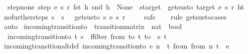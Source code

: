 \begin{isabellebody}
\ \ step{\isacharunderscore}none{\isacharcolon}\ {\isachardoublequoteopen}step\ e\ s\ r\ {\isacharparenleft}fst\ h{\isacharparenright}\ {\isacharparenleft}snd\ h{\isacharparenright}\ {\isacharequal}\ None\ {\isasymLongrightarrow}\ s{\isacharequal}target\ {\isasymLongrightarrow}\ gets{\isacharunderscore}us{\isacharunderscore}to\ target\ e\ s\ r\ {\isacharparenleft}h{\isacharhash}t{\isacharparenright}{\isachardoublequoteclose}\isanewline
\isanewline
{}\isamarkupfalse%
\ no{\isacharunderscore}further{\isacharunderscore}steps{\isacharcolon}\ {\isachardoublequoteopen}s\ {\isasymnoteq}\ s{\isacharprime}\ {\isasymLongrightarrow}\ {\isasymnot}\ gets{\isacharunderscore}us{\isacharunderscore}to\ s\ e\ s{\isacharprime}\ r\ {\isacharbrackleft}{\isacharbrackright}{\isachardoublequoteclose}\isanewline
%
\isadelimproof
\ \ %
\endisadelimproof
%
\isatagproof
{}\isamarkupfalse%
\ safe\isanewline
\ \ \isamarkupfalse%
\ {\isacharparenleft}rule\ gets{\isacharunderscore}us{\isacharunderscore}to{\isachardot}cases{\isacharparenright}\isanewline
\ \ \isamarkupfalse%
\ auto%
\endisatagproof
{\isafoldproof}%
%
\isadelimproof
\isanewline
%
\endisadelimproof
\isanewline
{}\isamarkupfalse%
\ incoming{\isacharunderscore}transition{\isacharunderscore}to\ {\isacharcolon}{\isacharcolon}\ {\isachardoublequoteopen}transition{\isacharunderscore}matrix\ {\isasymRightarrow}\ nat\ {\isasymRightarrow}\ bool{\isachardoublequoteclose}\ \isanewline
\ \ {\isachardoublequoteopen}incoming{\isacharunderscore}transition{\isacharunderscore}to\ t\ s\ {\isacharequal}\ {\isacharparenleft}{\isacharparenleft}ffilter\ {\isacharparenleft}{\isasymlambda}{\isacharparenleft}{\isacharparenleft}from{\isacharcomma}\ to{\isacharparenright}{\isacharcomma}\ t{\isacharparenright}{\isachardot}\ to\ {\isacharequal}\ s{\isacharparenright}\ t{\isacharparenright}\ {\isasymnoteq}\ {\isacharbraceleft}{\isacharbar}{\isacharbar}{\isacharbraceright}{\isacharparenright}{\isachardoublequoteclose}\isanewline
\isanewline
{}\isamarkupfalse%
\ incoming{\isacharunderscore}transition{\isacharunderscore}alt{\isacharunderscore}def{\isacharcolon}\ {\isachardoublequoteopen}incoming{\isacharunderscore}transition{\isacharunderscore}to\ e\ n\ {\isacharequal}\ {\isacharparenleft}{\isasymexists}t\ from{\isachardot}\ {\isacharparenleft}{\isacharparenleft}from{\isacharcomma}\ n{\isacharparenright}{\isacharcomma}\ t{\isacharparenright}\ {\isacharbar}{\isasymin}{\isacharbar}\ e{\isacharparenright}{\isachardoublequoteclose}\isanewline

\end{isabellebody}

